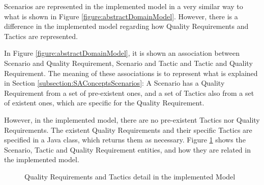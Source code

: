 Scenarios are represented in the implemented model in a very similar way to what is shown in Figure \ref{figure:abstractDomainModel}. However, there is a difference in the implemented model regarding how Quality Requirements and Tactics are represented.

In Figure \ref{figure:abstractDomainModel}, it is shown an association between Scenario and Quality Requirement, Scenario and Tactic and Tactic and Quality Requirement. The meaning of these associations is to represent what is explained in Section \ref{subsection:SAConceptsScenarios}: A Scenario has a Quality Requirement from a set of pre-existent ones, and a set of Tactics also from a set of existent ones, which are specific for the Quality Requirement.

However, in the implemented model, there are no pre-existent Tactics nor Quality Requirements. The existent Quality Requirements and their specific Tactics are specified in a Java class, which returns them as necessary. Figure \ref{figure:modelQRTactics} shows the Scenario, Tactic and Quality Requirement entities, and how they are related in the implemented model.

\begin{figure}[h]
\centering
\renewcommand {\umltextcolor}{black}
\renewcommand {\umlfillcolor}{none}
\renewcommand {\umldrawcolor}{black}

\caption{Quality Requirements and Tactics detail in the implemented Model}
\label{figure:modelQRTactics}
\end{figure}

